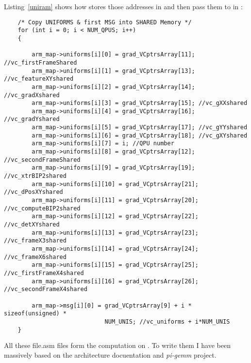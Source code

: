 Listing~\ref{uniram} shows how \cpu{} stores those addresses in \ram{} and then pass them to \vc{} in :
\begin{lstlisting}
    /* Copy UNIFORMS & first MSG into SHARED Memory */
    for (int i = 0; i < NUM_QPUS; i++)
    {

        arm_map->uniforms[i][0] = grad_VCptrsArray[11]; //vc_firstFrameShared
        arm_map->uniforms[i][1] = grad_VCptrsArray[13]; //vc_featureXYshared
        arm_map->uniforms[i][2] = grad_VCptrsArray[14]; //vc_gradXshared
        arm_map->uniforms[i][3] = grad_VCptrsArray[15]; //vc_gXXshared
        arm_map->uniforms[i][4] = grad_VCptrsArray[16]; //vc_gradYshared
        arm_map->uniforms[i][5] = grad_VCptrsArray[17]; //vc_gYYshared
        arm_map->uniforms[i][6] = grad_VCptrsArray[18]; //vc_gXYshared
        arm_map->uniforms[i][7] = i; //QPU number
        arm_map->uniforms[i][8] = grad_VCptrsArray[12]; //vc_secondFrameShared
        arm_map->uniforms[i][9] = grad_VCptrsArray[19]; //vc_xtrBIP2shared
        arm_map->uniforms[i][10] = grad_VCptrsArray[21]; //vc_dPosXYshared
        arm_map->uniforms[i][11] = grad_VCptrsArray[20]; //vc_computeBIP2shared
        arm_map->uniforms[i][12] = grad_VCptrsArray[22]; //vc_detXYshared
        arm_map->uniforms[i][13] = grad_VCptrsArray[23]; //vc_frameX3shared
        arm_map->uniforms[i][14] = grad_VCptrsArray[24]; //vc_frameX6shared
        arm_map->uniforms[i][15] = grad_VCptrsArray[25]; //vc_firstFrameX4shared
        arm_map->uniforms[i][16] = grad_VCptrsArray[26]; //vc_secondFrameX4shared

        arm_map->msg[i][0] = grad_VCptrsArray[9] + i * sizeof(unsigned) *
                             NUM_UNIS; //vc_uniforms + i*NUM_UNIS
    }
\end{lstlisting}


All these file{.asm} files form the \flow{} computation on \vc{}. To write them I have been massively based on the \vc{} architecture docuentation \parencite{refVC} and \emph{pi-gemm} project.
